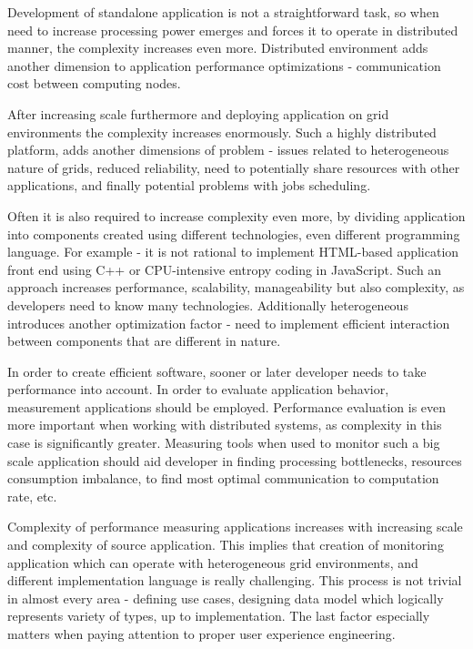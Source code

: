 Development of standalone application is not a straightforward task, so when need to increase processing power emerges and forces it to operate in distributed manner, the complexity increases even more. Distributed environment adds another dimension to application performance optimizations - communication cost between computing nodes.

After increasing scale furthermore and deploying application on grid environments the complexity increases enormously. Such a highly distributed platform, adds another dimensions of problem - issues related to heterogeneous nature of grids, reduced reliability, need to potentially share resources with other applications, and finally potential problems with jobs scheduling.

Often it is also required to increase complexity even more, by dividing application into components created using different technologies, even different programming language. For example - it is not rational to implement HTML-based application front end using C++ or CPU-intensive entropy coding in JavaScript. Such an approach increases performance, scalability, manageability but also complexity, as developers need to know many technologies. Additionally heterogeneous introduces another optimization factor - need to implement efficient interaction between components that are different in nature.

In order to create efficient software, sooner or later developer needs to take performance into account. In order to evaluate application behavior, measurement applications should be employed. Performance evaluation is even more important when working with distributed systems, as complexity in this case is significantly greater. Measuring tools when used to monitor such a big scale application should aid developer in finding processing bottlenecks, resources consumption imbalance, to find most optimal communication to computation rate, etc. 

Complexity of performance measuring applications increases with increasing scale and complexity of source application. This implies that creation of monitoring application which can operate with heterogeneous grid environments, and different implementation language is really challenging. This process is not trivial in almost every area - defining use cases, designing data model which logically represents variety of types, up to implementation. The last factor especially matters when paying attention to proper user experience engineering.

